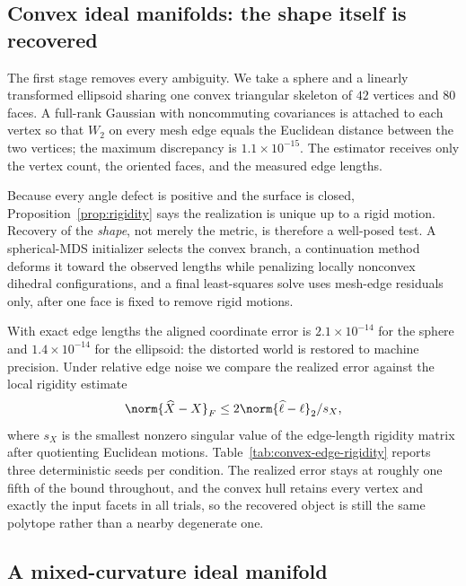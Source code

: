 \subsection{Convex ideal manifolds: the shape itself is recovered}
\label{sec:convex-experiment}

The first stage removes every ambiguity.  We take a sphere and a linearly
transformed ellipsoid sharing one convex triangular skeleton of $42$ vertices
and $80$ faces.  A full-rank Gaussian with noncommuting covariances is
attached to each vertex so that $W_2$ on every mesh edge equals the Euclidean
distance between the two vertices; the maximum discrepancy is
$1.1\times10^{-15}$.  The estimator receives only the vertex count, the
oriented faces, and the measured edge lengths.

Because every angle defect is positive and the surface is closed,
Proposition~\ref{prop:rigidity} says the realization is unique up to a rigid
motion.  Recovery of the \emph{shape}, not merely the metric, is therefore a
well-posed test.  A spherical-MDS initializer selects the convex branch, a
continuation method deforms it toward the observed lengths while penalizing
locally nonconvex dihedral configurations, and a final least-squares solve
uses mesh-edge residuals only, after one face is fixed to remove rigid
motions.

With exact edge lengths the aligned coordinate error is $2.1\times10^{-14}$
for the sphere and $1.4\times10^{-14}$ for the ellipsoid: the distorted world
is restored to machine precision.  Under relative edge noise we compare the
realized error against the local rigidity estimate
\begin{equation}
 \norm{\widehat X-X}_F\le 2\norm{\widehat\ell-\ell}_2/s_X,
 \label{eq:rigidity-bound}
\end{equation}
where $s_X$ is the smallest nonzero singular value of the edge-length rigidity
matrix after quotienting Euclidean motions.  Table~\ref{tab:convex-edge-rigidity}
reports three deterministic seeds per condition.  The realized error stays at
roughly one fifth of the bound throughout, and the convex hull retains every
vertex and exactly the input facets in all trials, so the recovered object is
still the same polytope rather than a nearby degenerate one.



\subsection{A mixed-curvature ideal manifold}
\label{sec:controlled-experiment}

